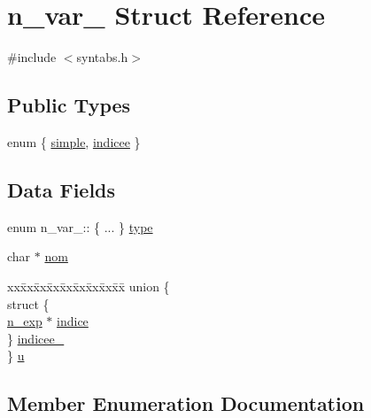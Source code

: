 \hypertarget{structn__var__}{}\section{n\+\_\+var\+\_\+ Struct Reference}
\label{structn__var__}


{\ttfamily \#include $<$syntabs.\+h$>$}

\subsection*{Public Types}
\begin{DoxyCompactItemize}
\item 
enum \{ \hyperlink{structn__var___a072f7dbdade03422271502dcb31c4967af3e7fed5ab3db218a1b9ad36a428c360}{simple}, 
\hyperlink{structn__var___a072f7dbdade03422271502dcb31c4967a27e5275f5f0eb329410b1b7100c310fc}{indicee}
 \}
\end{DoxyCompactItemize}
\subsection*{Data Fields}
\begin{DoxyCompactItemize}
\item 
enum n\+\_\+var\+\_\+\+:: \{ ... \}  \hyperlink{structn__var___aa31a9a12b79f3948485ad279dc9acb18}{type}
\item 
char $\ast$ \hyperlink{structn__var___a660e3d28fd5c847b70b755f20365d5f1}{nom}
\item 
\begin{tabbing}
xx\=xx\=xx\=xx\=xx\=xx\=xx\=xx\=xx\=\kill
union \{\\
\>struct \{\\
\>\>\hyperlink{syntabs_8h_a9648f2af191445619fc50968978276c1}{n\_exp} $\ast$ \hyperlink{structn__var___a3597cb828eb8afd840ad9405b086259a}{indice}\\
\>\} \hyperlink{structn__var___a15624714a0e7b0ab8769c2f9d8878e17}{indicee\_}\\
\} \hyperlink{structn__var___aef779b93782db721a635e1da0b8e61f2}{u}\\

\end{tabbing}\end{DoxyCompactItemize}


\subsection{Member Enumeration Documentation}
